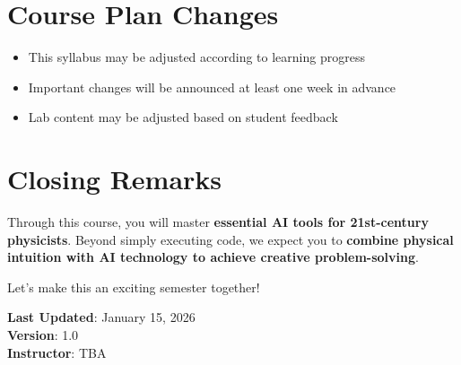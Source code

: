 \documentclass[11pt,a4paper]{article}
\begin{document}
\section{Course Plan Changes}

\begin{itemize}[noitemsep]
    \item This syllabus may be adjusted according to learning progress
    \item Important changes will be announced at least one week in advance
    \item Lab content may be adjusted based on student feedback
\end{itemize}

\vspace{1cm}

\section*{Closing Remarks}

Through this course, you will master \textbf{essential AI tools for 21st-century physicists}. Beyond simply executing code, we expect you to \textbf{combine physical intuition with AI technology to achieve creative problem-solving}.

Let's make this an exciting semester together!

\vspace{1cm}

\noindent\textbf{Last Updated}: January 15, 2026\\
\textbf{Version}: 1.0\\
\textbf{Instructor}: TBA
\end{document}
